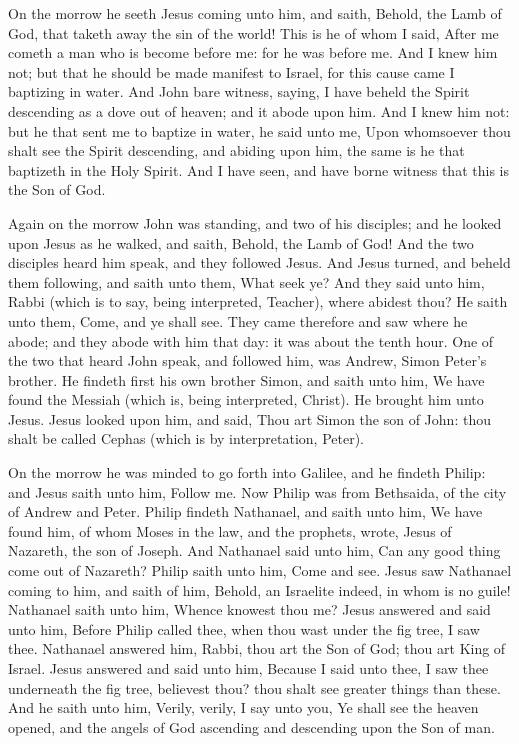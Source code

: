 On the morrow he seeth Jesus coming unto him, and saith, Behold, the Lamb of God, that taketh away the sin of the world! This is he of whom I said, After me cometh a man who is become before me: for he was before me. And I knew him not; but that he should be made manifest to Israel, for this cause came I baptizing in water. And John bare witness, saying, I have beheld the Spirit descending as a dove out of heaven; and it abode upon him. And I knew him not: but he that sent me to baptize in water, he said unto me, Upon whomsoever thou shalt see the Spirit descending, and abiding upon him, the same is he that baptizeth in the Holy Spirit. And I have seen, and have borne witness that this is the Son of God.  

Again on the morrow John was standing, and two of his disciples; and he looked upon Jesus as he walked, and saith, Behold, the Lamb of God! And the two disciples heard him speak, and they followed Jesus. And Jesus turned, and beheld them following, and saith unto them, What seek ye? And they said unto him, Rabbi (which is to say, being interpreted, Teacher), where abidest thou? He saith unto them, Come, and ye shall see. They came therefore and saw where he abode; and they abode with him that day: it was about the tenth hour. One of the two that heard John speak, and followed him, was Andrew, Simon Peter’s brother. He findeth first his own brother Simon, and saith unto him, We have found the Messiah (which is, being interpreted, Christ). He brought him unto Jesus. Jesus looked upon him, and said, Thou art Simon the son of John: thou shalt be called Cephas (which is by interpretation, Peter).  

On the morrow he was minded to go forth into Galilee, and he findeth Philip: and Jesus saith unto him, Follow me. Now Philip was from Bethsaida, of the city of Andrew and Peter. Philip findeth Nathanael, and saith unto him, We have found him, of whom Moses in the law, and the prophets, wrote, Jesus of Nazareth, the son of Joseph. And Nathanael said unto him, Can any good thing come out of Nazareth? Philip saith unto him, Come and see. Jesus saw Nathanael coming to him, and saith of him, Behold, an Israelite indeed, in whom is no guile! Nathanael saith unto him, Whence knowest thou me? Jesus answered and said unto him, Before Philip called thee, when thou wast under the fig tree, I saw thee. Nathanael answered him, Rabbi, thou art the Son of God; thou art King of Israel. Jesus answered and said unto him, Because I said unto thee, I saw thee underneath the fig tree, believest thou? thou shalt see greater things than these. And he saith unto him, Verily, verily, I say unto you, Ye shall see the heaven opened, and the angels of God ascending and descending upon the Son of man. 


